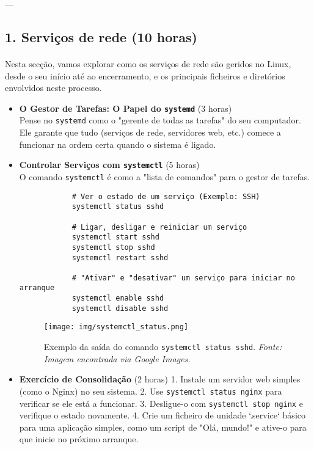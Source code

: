 \documentclass[10pt,a4paper]{article}
\begin{document}
	---
	
	\subsection*{1. Serviços de rede (10 horas)}
	\vspace{-1.2em}
	\paragraph{}
	Nesta secção, vamos explorar como os serviços de rede são geridos no Linux, desde o seu início até ao encerramento, e os principais ficheiros e diretórios envolvidos neste processo.
	
	\begin{itemize}
		\item \textbf{O Gestor de Tarefas: O Papel do \texttt{systemd}} (3 horas) \\
		Pense no \texttt{systemd} como o "gerente de todas as tarefas" do seu computador. Ele garante que tudo (serviços de rede, servidores web, etc.) comece a funcionar na ordem certa quando o sistema é ligado.
		
		\item \textbf{Controlar Serviços com \texttt{systemctl}} (5 horas) \\
		O comando \texttt{systemctl} é como a "lista de comandos" para o gestor de tarefas.
		\begin{verbatim}
			# Ver o estado de um serviço (Exemplo: SSH)
			systemctl status sshd
			
			# Ligar, desligar e reiniciar um serviço
			systemctl start sshd
			systemctl stop sshd
			systemctl restart sshd
			
			# "Ativar" e "desativar" um serviço para iniciar no arranque
			systemctl enable sshd
			systemctl disable sshd
		\end{verbatim}
		
		\begin{figure}[h]
			\centering
			\texttt{[image: img/systemctl\_status.png]}
			\caption{Exemplo da saída do comando \texttt{systemctl status sshd}. \textit{Fonte: Imagem encontrada via Google Images.}}
			\label{fig:systemctl_status}
		\end{figure}
		
		\item \textbf{Exercício de Consolidação} (2 horas)
		1. Instale um servidor web simples (como o Nginx) no seu sistema.
		2. Use \texttt{systemctl status nginx} para verificar se ele está a funcionar.
		3. Desligue-o com \texttt{systemctl stop nginx} e verifique o estado novamente.
		4. Crie um ficheiro de unidade `.service` básico para uma aplicação simples, como um script de "Olá, mundo!" e ative-o para que inicie no próximo arranque.
	\end{itemize}
	
\end{document}
